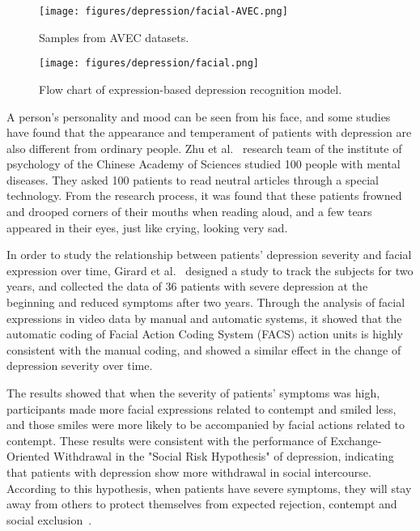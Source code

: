 \begin{figure}[tbp]
	\centering	
	\label{fig_hard_case1}\texttt{[image: figures/depression/facial-AVEC.png]}		
	\caption{
	Samples from AVEC datasets.
	}
	\label{facial-AVEC}
\end{figure}

\begin{figure}[tbp]
	\centering	
	\label{fig_hard_case1}\texttt{[image: figures/depression/facial.png]}		
	\caption{
	Flow chart of expression-based depression recognition model.
	}
	\label{facial}
\end{figure}

A person's personality and mood can be seen from his face, and some studies have found that the appearance and temperament of patients with depression are also different from ordinary people.
Zhu et al.~\cite{0Identifying} research team of the institute of psychology of the Chinese Academy of Sciences studied 100 people with mental diseases. They asked 100 patients to read neutral articles through a special technology. From the research process, it was found that these patients frowned and drooped corners of their mouths when reading aloud, and a few tears appeared in their eyes, just like crying, looking very sad.

In order to study the relationship between patients' depression severity and facial expression over time, Girard et al.~\cite{2013Social} designed a study to track the subjects for two years, and collected the data of 36 patients with severe depression at the beginning and reduced symptoms after two years. Through the analysis of facial expressions in video data by manual and automatic systems, it showed that the automatic coding of Facial Action Coding System (FACS) action units is highly consistent with the manual coding, and showed a similar effect in the change of depression severity over time.

The results showed that when the severity of patients' symptoms was high, participants made more facial expressions related to contempt and smiled less, and those smiles were more likely to be accompanied by facial actions related to contempt. These results were consistent with the performance of Exchange-Oriented Withdrawal in the "Social Risk Hypothesis" of depression, indicating that patients with depression show more withdrawal in social intercourse. According to this hypothesis, when patients have severe symptoms, they will stay away from others to protect themselves from expected rejection, contempt and social exclusion~\cite{2005Emotion,BYLSMA2008676,2017Facial}.

